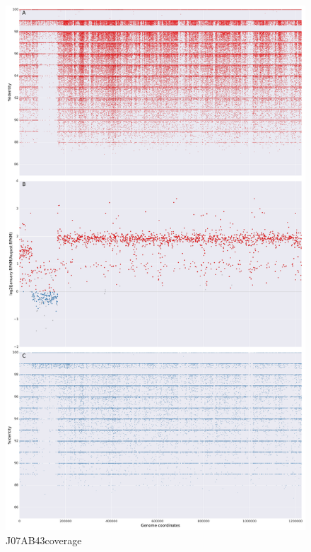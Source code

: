 \begin{figure}[!hbtp]
  \centering
  \includegraphics[width=\textwidth,height=\textheight,keepaspectratio]{Chapter5/Figures/coverage_plots/J07AB43_coverage.pdf}
  \caption{J07AB43coverage}
  \label{J07AB43ccoverage}
\end{figure}

